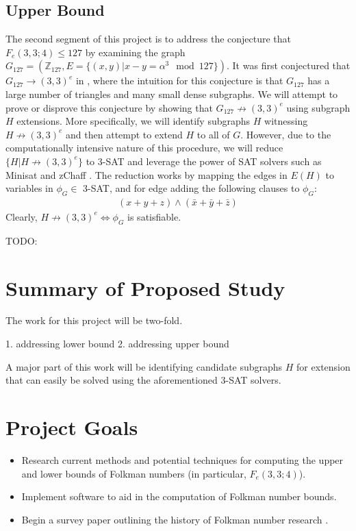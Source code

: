 \documentclass[paper=a4, fontsize=11pt]{scrartcl} %
\begin{document}
\subsection{Upper Bound}
The second segment of this project is to address the conjecture that $F_e(3,3;4) \leq 127$ by
examining the graph $G_{127} = (\mathbb{Z}_{127}, E = \{(x,y) | x - y = \alpha^3 \mod 127\})$.
It was first conjectured that $G_{127} \to (3,3)^e$ in \cite{spr07}, where the intuition for this
conjecture is that $G_{127}$ has a large number of triangles and many small dense subgraphs.
We will attempt to prove or disprove this conjecture by showing that $G_{127} \not \to (3,3)^e$
using subgraph $H$ extensions. More specifically, we will identify subgraphs $H$ witnessing
$H \not \to (3,3)^e$ and then attempt to extend $H$ to all of $G$. However, due to the computationally
intensive nature of this procedure, we will reduce $\{H | H \not \to (3,3)^e\}$ to 3-SAT and leverage
the power of SAT solvers such as Minisat \cite{minisat} and zChaff \cite{zchaff}. The reduction works by
mapping the edges in $E(H)$ to variables in $\phi_G \in$ 3-SAT, and for edge adding the following
clauses to $\phi_G$:
\begin{align*}
(x + y + z) \wedge (\bar{x} + \bar{y} + \bar{z})
\end{align*}
Clearly, $H \not \to (3,3)^e \Leftrightarrow \phi_G$ is satisfiable. 

TODO: 

\section{Summary of Proposed Study}
The work for this project will be two-fold. 

1. addressing lower bound
2. addressing upper bound

A major part of this work will be identifying
candidate subgraphs $H$ for extension that can easily be solved using the aforementioned 3-SAT solvers.

\section{Project Goals}
\begin{itemize}
	\item Research current methods and potential techniques for computing the upper and lower bounds of Folkman numbers (in particular, $F_e(3,3;4)$).
	\item Implement software to aid in the computation of Folkman number bounds.
	\item Begin a survey paper outlining the history of Folkman number research \cite{sprSurvey}.
\end{itemize}
\end{document}
